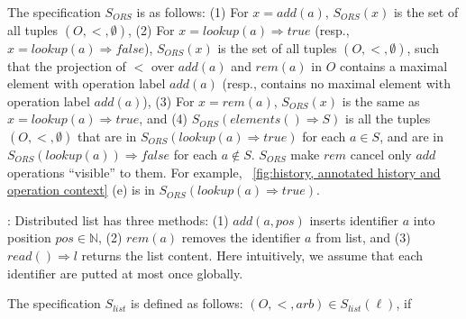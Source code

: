 The specification $S_{\mathit{ORS}}$ is as follows: (1) For $x=\mathit{add}(a)$, $S_{\mathit{ORS}}(x)$ is the set of all tuples $(O,<,\emptyset)$, (2) For $x=\mathit{lookup}(a) \Rightarrow \mathit{true}$ (resp., $x=\mathit{lookup}(a) \Rightarrow \mathit{false}$), $S_{\mathit{ORS}}(x)$ is the set of all tuples $(O,<,\emptyset)$, such that the projection of $<$ over $\mathit{add}(a)$ and $\mathit{rem}(a)$ in $O$ contains a maximal element with operation label $\mathit{add}(a)$ (resp., contains no maximal element with operation label $\mathit{add}(a)$), (3) For $x = \mathit{rem}(a)$, $S_{\mathit{ORS}}(x)$ is the same as $x = \mathit{lookup}(a) \Rightarrow \mathit{true}$, and (4) $S_{\mathit{ORS}}(\mathit{elements}() \Rightarrow S)$ is all the tuples $(O,<,\emptyset)$ that are in $S_{\mathit{ORS}}(\mathit{lookup}(a) \Rightarrow \mathit{true})$ for each $a \in S$, and are in $S_{\mathit{ORS}}(\mathit{lookup}(a)) \Rightarrow \mathit{false}$ for each $a \notin S$. {\color {red} $S_{\mathit{ORS}}$ make $\mathit{rem}$ cancel only $\mathit{add}$ operations ``visible'' to them. For example, \figurename~\ref{fig:history, annotated history and operation context} (e) is in $S_{\mathit{ORS}}(\mathit{lookup}(a) \Rightarrow \mathit{true})$.}

: Distributed list has three methods: (1) $\mathit{add}(a,\mathit{pos})$ inserts identifier $a$ into position $\mathit{pos} \in \mathbb{N}$, (2) $\mathit{rem}(a)$ removes the identifier $a$ from list, and (3) $\mathit{read}() \Rightarrow l$ returns the list content. Here intuitively, we assume that each identifier are putted at most once globally.

The specification $S_{\mathit{list}}$ is defined as follows: $(O,<,\mathit{arb}) \in S_{\mathit{list}}(\ell)$, if

